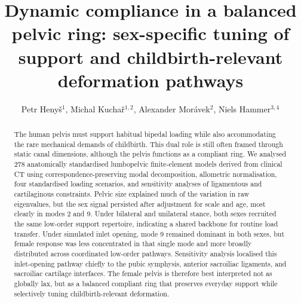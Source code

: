 \documentclass[openacc]{rsproca_new}
\begin{document}
\title{Dynamic compliance in a balanced pelvic ring: sex-specific tuning of support and childbirth-relevant deformation pathways}
\author{Petr Heny\v{s}$^{1}$, Michal Kucha\v{r}$^{1,2}$, Alexander Mor\'{a}vek$^{2}$, Niels Hammer$^{3,4}$}
\address{$^{1}$Institute of New Technologies and Applied Informatics, Faculty of Mechatronics, Informatics and Interdisciplinary Studies, Technical University of Liberec, Liberec, Czech Republic\\$^{2}$Department of Anatomy, Faculty of Medicine in Hradec Kr\'{a}lov\'{e}, Charles University, Hradec Kr\'{a}lov\'{e}, Czech Republic\\$^{3}$Division of Macroscopic and Clinical Anatomy, Gottfried Schatz Research Center, Medical University of Graz, Graz, Austria\\$^{4}$Division of Macroscopic and Clinical Anatomy, Gottfried Schatz Research Center, Medical University of Graz, Graz, Austria; Department of Orthopedic and Trauma Surgery, University of Leipzig, Leipzig, Germany; Division of Biomechatronics, Fraunhofer IWU, Dresden, Germany}
\subject{biomechanics, evolutionary anthropology, obstetrics}
\begin{abstract}The human pelvis must support habitual bipedal loading while also accommodating the rare mechanical demands of childbirth. This dual role is still often framed through static canal dimensions, although the pelvis functions as a compliant ring. We analysed 278 anatomically standardised lumbopelvic finite-element models derived from clinical CT using correspondence-preserving modal decomposition, allometric normalisation, four standardised loading scenarios, and sensitivity analyses of ligamentous and cartilaginous constraints. Pelvic size explained much of the variation in raw eigenvalues, but the sex signal persisted after adjustment for scale and age, most clearly in modes 2 and 9. Under bilateral and unilateral stance, both sexes recruited the same low-order support repertoire, indicating a shared backbone for routine load transfer. Under simulated inlet opening, mode 9 remained dominant in both sexes, but female response was less concentrated in that single mode and more broadly distributed across coordinated low-order pathways. Sensitivity analysis localised this inlet-opening pathway chiefly to the pubic symphysis, anterior sacroiliac ligaments, and sacroiliac cartilage interfaces. The female pelvis is therefore best interpreted not as globally lax, but as a balanced compliant ring that preserves everyday support while selectively tuning childbirth-relevant deformation.\end{abstract}
\maketitle
\end{document}
